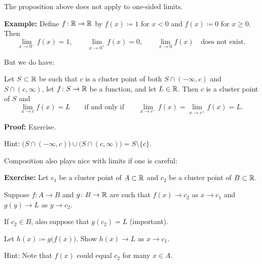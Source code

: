 \documentclass[10pt,aspectratio=149]{beamer}
\begin{document}
\begin{frame}

The proposition above does not apply to one-sided limits.

\pause
\medskip

\textbf{Example:}
Define $f \colon {\mathbb{R}} \to {\mathbb{R}}$ by $f(x) \coloneqq 1$ for $x < 0$ and
$f(x) \coloneqq 0$ for $x \geq 0$. Then
\begin{equation*}
\lim_{x \to 0^-} f(x) = 1, \qquad
\lim_{x \to 0^+} f(x) = 0, \qquad
\lim_{x \to 0} f(x) \quad \text{does not exist.}
\end{equation*}

\pause
\medskip

But we do have:

\begin{proposition}
Let $S \subset {\mathbb{R}}$ be such that $c$ is a cluster point
of both $S \cap (-\infty,c)$ and $S \cap (c,\infty)$, let
$f \colon S \to {\mathbb{R}}$ be a function, and let $L \in {\mathbb{R}}$.
\pause
Then $c$ is a cluster point of $S$ and
\begin{equation*}
\lim_{x \to c} f(x) = L
\qquad \text{if and only if} \qquad
\lim_{x \to c^-} f(x) =
\lim_{x \to c^+} f(x) =
L .
\end{equation*}
\end{proposition}

\pause
\textbf{Proof:} Exercise.

\pause
\medskip

Hint:
$\bigl( S \cap (-\infty,c) \bigr) \cup \bigl( S \cap (c,\infty) \bigr)
= S \setminus \{ c \}$.
\end{frame}

\begin{frame}
Composition also plays nice with limits if one is careful:

\pause
\medskip

\textbf{Exercise:}
Let $c_1$ be a cluster point of $A \subset {\mathbb{R}}$ and $c_2$ be a cluster point of $B \subset {\mathbb{R}}$.

\pause
Suppose $f \colon A \to B$ and $g \colon B \to {\mathbb{R}}$ are
such that $f(x) \to c_2$ as $x \to c_1$ and
$g(y) \to L$ as $y \to c_2$.

\pause
If $c_2 \in B$, also suppose that $g(c_2) = L$ (important).

\pause
Let $h(x) \coloneqq g\bigl(f(x)\bigr)$.  Show
$h(x) \to L$ as $x \to c_1$.

\pause
\medskip

Hint: Note that $f(x)$ could equal $c_2$ for many $x \in A$.
\end{frame}
\end{document}
